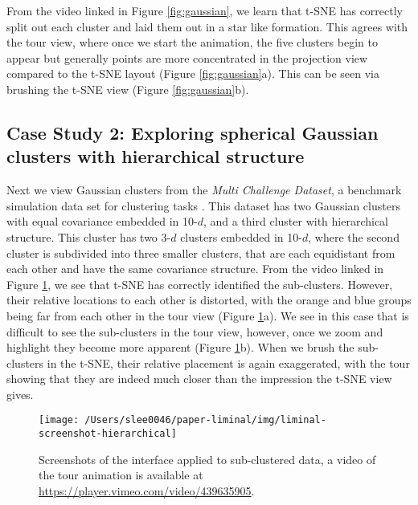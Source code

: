 \documentclass[article,notitle]{jdssv}
\begin{document}
From the video linked in Figure \ref{fig:gaussian}, we learn that t-SNE has
correctly split out each cluster and laid them out in a star like formation.
This agrees with the tour view,
where once we start the animation, the five clusters begin to appear but
generally points are more concentrated in the projection view compared to
the t-SNE layout (Figure \ref{fig:gaussian}a).
This can be seen via brushing the t-SNE view (Figure \ref{fig:gaussian}b).

\hypertarget{case-study-2-exploring-spherical-gaussian-clusters-with-hierarchical-structure}{%
\subsection{Case Study 2: Exploring spherical Gaussian clusters with hierarchical structure}\label{case-study-2-exploring-spherical-gaussian-clusters-with-hierarchical-structure}}

Next we view Gaussian clusters from the
\emph{Multi Challenge Dataset}, a benchmark simulation data set for clustering tasks
\citep{Rauber2009-vh}. This dataset has two Gaussian clusters with equal covariance
embedded in 10-\(d\), and a third cluster
with hierarchical structure. This cluster has two 3-\(d\) clusters embedded in
10-\(d\), where the second cluster is subdivided into three smaller clusters,
that are each equidistant from each other and have the same covariance structure.
From the video linked in Figure \ref{fig:hierarchical}, we see
that t-SNE has correctly identified the sub-clusters. However, their relative
locations to each other is distorted, with the orange and blue groups being
far from each other in the tour view (Figure \ref{fig:hierarchical}a). We see
in this case that is difficult
to see the sub-clusters in the tour view, however, once we zoom and highlight
they become more apparent (Figure \ref{fig:hierarchical}b). When we brush
the sub-clusters in the t-SNE, their
relative placement is again exaggerated, with the tour showing that they
are indeed much closer than the impression the t-SNE view gives.



\begin{figure}

{\centering \texttt{[image: /Users/slee0046/paper-liminal/img/liminal-screenshot-hierarchical]} 

}

\caption{Screenshots of the  interface applied to sub-clustered data, a video of the tour animation is available at \url{https://player.vimeo.com/video/439635905}.}\label{fig:hierarchical}
\end{figure}
\end{document}
